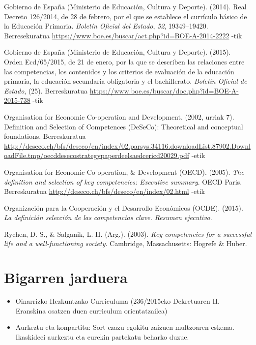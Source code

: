 \documentclass[
]{book}
\begin{document}
Gobierno de España (Ministerio de Educación, Cultura y Deporte). (2014). Real Decreto 126/2014, de 28 de febrero, por el que se establece el currículo básico de la Educación Primaria. \emph{Boletín Oficial del Estado}, \emph{52}, 19349--19420. Berresekuratua \url{https://www.boe.es/buscar/act.php?id=BOE-A-2014-2222} -tik

Gobierno de España (Ministerio de Educación, Cultura y Deporte). (2015). Orden Ecd/65/2015, de 21 de enero, por la que se describen las relaciones entre las competencias, los contenidos y los criterios de evaluación de la educación primaria, la educación secundaria obligatoria y el bachillerato. \emph{Boletín Oficial de Estado}, (25). Berreskuratua \url{https://www.boe.es/buscar/doc.php?id=BOE-A-2015-738} -tik

Organisation for Economic Co-operation and Development. (2002, urriak 7). Definition and Selection of Competences (DeSeCo): Theoretical and conceptual foundations. Berreskuratua \url{http://deseco.ch/bfs/deseco/en/index/02.parsys.34116.downloadList.87902.DownloadFile.tmp/oecddesecostrategypaperdeelsaedcericd20029.pdf} -etik

Organisation for Economic Co-operation, \& Development (OECD). (2005). \emph{The definition and selection of key competencies: Executive summary}. OECD Paris. Berreskuratua \url{http://deseco.ch/bfs/deseco/en/index/02.html} -etik

Organización para la Cooperación y el Desarrollo Económicos (OCDE). (2015). \emph{La definición selección de las competencias clave. Resumen ejecutivo}.

Rychen, D. S., \& Salganik, L. H. (Arg.). (2003). \emph{Key competencies for a successful life and a well-functioning society}. Cambridge, Massachusetts: Hogrefe \& Huber.

\hypertarget{bigarren-jarduera}{%
\chapter*{Bigarren jarduera}\label{bigarren-jarduera}}

\begin{itemize}
\item
  Oinarrizko Hezkuntzako Curriculuma
  (236/2015eko Dekretuaren II. Eranskina osatzen duen curriculum orientatzailea)
\item
  Aurkeztu eta konpartitu:
  Sort ezazu egokitu zaizuen multzoaren eskema. Ikaskideei aurkeztu eta eurekin partekatu beharko duzue.
\end{itemize}
\end{document}
